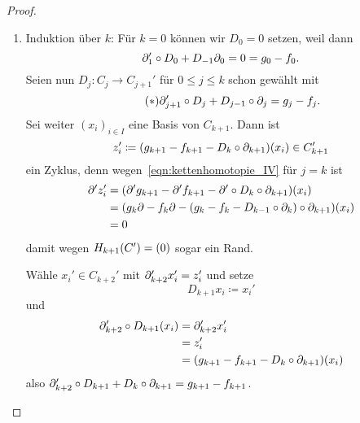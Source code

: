 \begin{proof}
  \begin{enumerate}
    \item
      Induktion über $k$:
      Für $k = 0$ können wir $D_0 = 0$ setzen, weil dann
      \begin{equation*}
        \partial_1' \circ D_0 + D_{-1} \partial_0 = 0 = g_0 - f_0.
      \end{equation*}
      Seien nun $D_{j} \colon C_j \to C_{j+1}'$ für $0 \le j \le k$ schon gewählt mit
      \begin{equation*}
        \tag{$\ast$}
        \label{eqn:kettenhomotopie_IV}
        \partial_{j+1}' \circ D_j + D_{j-1} \circ \partial_j = g_j - f_j.
      \end{equation*}
      Sei weiter ${(x_i)}_{i \in I}$ eine Basis von $C_{k+1}$.
      Dann ist
      \begin{equation*}
        z_{i}' \coloneqq (g_{k+1} - f_{k+1} - D_k \circ \partial_{k+1}) (x_i) \in C_{k+1}'
      \end{equation*}
      ein Zyklus, denn wegen~\eqref{eqn:kettenhomotopie_IV} für $j = k$ ist
      \begin{align*}
        \partial' z_i' & = (\partial' g_{k+1} - \partial' f_{k+1} - \partial' \circ D_k \circ \partial_{k+1}) (x_i)\\
        & = (g_k \partial - f_k \partial - (g_k - f_k - D_{k-1} \circ \partial_k) \circ \partial_{k+1}) (x_i)\\
        & = 0
      \end{align*}
      damit wegen $H_{k+1}(C') = (0)$ sogar ein Rand.

      Wähle $x_i' \in C_{k+2}'$ mit $\partial_{k+2}' x_i' = z_i'$ und setze
      \begin{equation*}
        D_{k+1} x_i \coloneqq x_i'
      \end{equation*}
      und
      \begin{align*}
        \partial_{k+2}' \circ D_{k+1} (x_i)
        & = \partial_{k+2}' x_i'\\
        & = z_i'\\
        & = (g_{k+1} - f_{k+1} - D_k \circ \partial_{k+1}) (x_i)
      \end{align*}
      also $\partial_{k+2}' \circ D_{k+1} + D_k \circ \partial_{k+1} = g_{k+1} - f_{k+1}$.
  \end{enumerate}
\end{proof}

